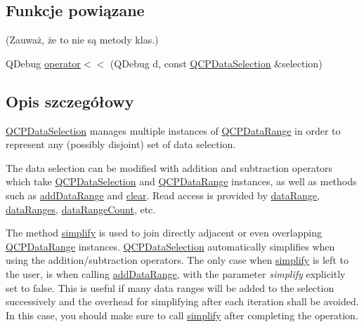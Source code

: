 \subsection*{Funkcje powiązane}
(Zauważ, że to nie są metody klas.) \begin{DoxyCompactItemize}
\item 
Q\+Debug \hyperlink{class_q_c_p_data_selection_aed65b8988afe6b03adeadf5edf663670}{operator$<$$<$} (Q\+Debug d, const \hyperlink{class_q_c_p_data_selection}{Q\+C\+P\+Data\+Selection} \&selection)
\end{DoxyCompactItemize}


\subsection{Opis szczegółowy}
\hyperlink{class_q_c_p_data_selection}{Q\+C\+P\+Data\+Selection} manages multiple instances of \hyperlink{class_q_c_p_data_range}{Q\+C\+P\+Data\+Range} in order to represent any (possibly disjoint) set of data selection.

The data selection can be modified with addition and subtraction operators which take \hyperlink{class_q_c_p_data_selection}{Q\+C\+P\+Data\+Selection} and \hyperlink{class_q_c_p_data_range}{Q\+C\+P\+Data\+Range} instances, as well as methods such as \hyperlink{class_q_c_p_data_selection_a46740c5aa7b80ae9b2abf6985d61b74f}{add\+Data\+Range} and \hyperlink{class_q_c_p_data_selection_a385dd665e6690d39afb8bbd727b1e00b}{clear}. Read access is provided by \hyperlink{class_q_c_p_data_selection_a6a9c39a2019cd6d2fdd329f415262b34}{data\+Range}, \hyperlink{class_q_c_p_data_selection_a74b63e4a98eb5eba0f6d77d2d4161a9a}{data\+Ranges}, \hyperlink{class_q_c_p_data_selection_a7edbfbaf77e22f70216749e73818e247}{data\+Range\+Count}, etc.

The method \hyperlink{class_q_c_p_data_selection_a4a2fbad1a6e4d1dd26fdfdf88956f2a4}{simplify} is used to join directly adjacent or even overlapping \hyperlink{class_q_c_p_data_range}{Q\+C\+P\+Data\+Range} instances. \hyperlink{class_q_c_p_data_selection}{Q\+C\+P\+Data\+Selection} automatically simplifies when using the addition/subtraction operators. The only case when \hyperlink{class_q_c_p_data_selection_a4a2fbad1a6e4d1dd26fdfdf88956f2a4}{simplify} is left to the user, is when calling \hyperlink{class_q_c_p_data_selection_a46740c5aa7b80ae9b2abf6985d61b74f}{add\+Data\+Range}, with the parameter {\itshape simplify} explicitly set to false. This is useful if many data ranges will be added to the selection successively and the overhead for simplifying after each iteration shall be avoided. In this case, you should make sure to call \hyperlink{class_q_c_p_data_selection_a4a2fbad1a6e4d1dd26fdfdf88956f2a4}{simplify} after completing the operation.

